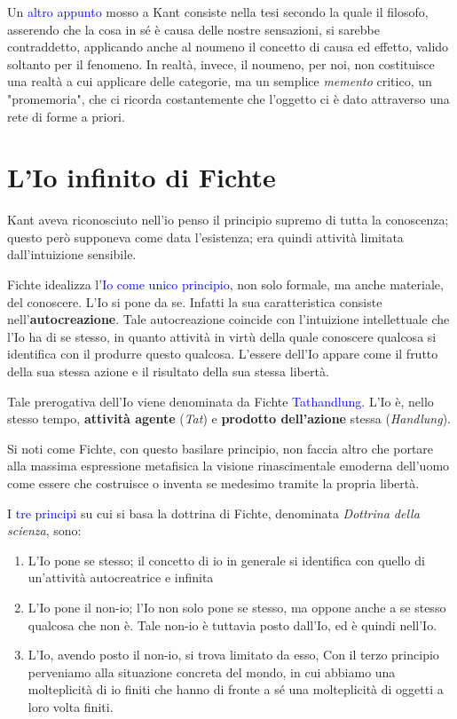 \documentclass[a4paper, twoside, titlepage]{book}
\renewcommand{\emph}[1]{\textcolor{blue}{#1}}
\begin{document}
Un \emph{altro appunto} mosso a Kant consiste nella tesi secondo la quale il filosofo, asserendo che la cosa in sé è causa delle nostre sensazioni, si sarebbe contraddetto, applicando anche al noumeno il concetto di causa ed effetto, valido soltanto per il fenomeno. In realtà, invece, il noumeno, per noi, non costituisce una realtà a cui applicare delle categorie, ma un semplice \textit{memento} critico, un "promemoria", che ci ricorda costantemente che l'oggetto ci è dato attraverso una rete di forme a priori.

\chapter{L'Io infinito di Fichte}

Kant aveva riconosciuto nell'io penso il principio supremo di tutta la conoscenza; questo però supponeva come data l'esistenza; era quindi attività limitata dall'intuizione sensibile.

Fichte idealizza l'\emph{Io come unico principio}, non solo formale, ma anche materiale, del conoscere.
L'Io si pone da se. Infatti la sua caratteristica consiste nell'\textbf{autocreazione}. Tale autocreazione coincide con l'intuizione intellettuale che l'Io ha di se stesso, in quanto attività in virtù della quale conoscere qualcosa si identifica con il produrre questo qualcosa. L'essere dell'Io appare come il frutto della sua stessa azione e il risultato della sua stessa libertà.

Tale prerogativa dell'Io viene denominata da Fichte \emph{Tathandlung}. L'Io è, nello stesso tempo, \textbf{attività agente} (\textit{Tat}) e \textbf{prodotto dell'azione} stessa (\textit{Handlung}).

Si noti come Fichte, con questo basilare principio, non faccia altro che portare alla massima espressione metafisica la visione rinascimentale emoderna dell'uomo come essere che costruisce o inventa se medesimo tramite la propria libertà.

I \emph{tre principi} su cui si basa la dottrina di Fichte, denominata \textit{Dottrina della scienza}, sono:
\begin{enumerate}
\item L'Io pone se stesso; il concetto di io in generale si identifica con quello di un'attività autocreatrice e infinita
\item L'Io pone il non-io; l'Io non solo pone se stesso, ma oppone anche a se stesso qualcosa che non è. Tale non-io è tuttavia posto dall'Io, ed è quindi nell'Io.
\item L'Io, avendo posto il non-io, si trova limitato da esso, Con il terzo principio perveniamo alla situazione concreta del mondo, in cui abbiamo una molteplicità di io finiti che hanno di fronte a sé una molteplicità di oggetti a loro volta finiti.
\end{enumerate}
\end{document}
